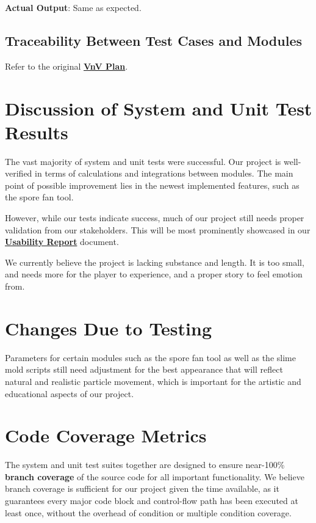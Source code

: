 \documentclass[12pt, titlepage]{article}
\begin{document}
\textbf{Actual Output}: Same as expected.



\subsection{Traceability Between Test Cases and Modules}
Refer to the original
\href{https://github.com/felix-hurst/Ad-Natura/blob/main/docs/VnVPlan/VnVPlan.pdf}{\bf{VnV Plan}}.


\section{Discussion of System and Unit Test Results}
The vast majority of system and unit tests were successful.
Our project is well-verified in terms of calculations and
integrations between modules. The main point of possible
improvement lies in the newest implemented features, such as
the spore fan tool.

However, while our tests indicate success, much of our project
still needs proper validation from our stakeholders. This will be
most prominently showcased in our
\href{https://github.com/felix-hurst/Ad-Natura/blob/main/docs/Extras/UsabilityReport/UsabilityReport.pdf}{\bf{Usability Report}} document.

We currently believe the project is lacking substance and length.
It is too small, and needs more for the player to experience, and
a proper story to feel emotion from.



\section{Changes Due to Testing}
Parameters for certain modules such as the spore fan tool
as well as the slime mold scripts still need adjustment for the
best appearance that will reflect natural and realistic particle
movement, which is important for the artistic and educational aspects
of our project.



\section{Code Coverage Metrics}
The system and unit test suites together are designed to ensure near-100\%
{\bf{branch coverage}} of the source code for all important functionality.
We believe branch coverage is sufficient for our project given the time
available, as it guarantees every major code block and control-flow path
has been executed at least once, without the overhead of condition or
multiple condition coverage.
\end{document}
